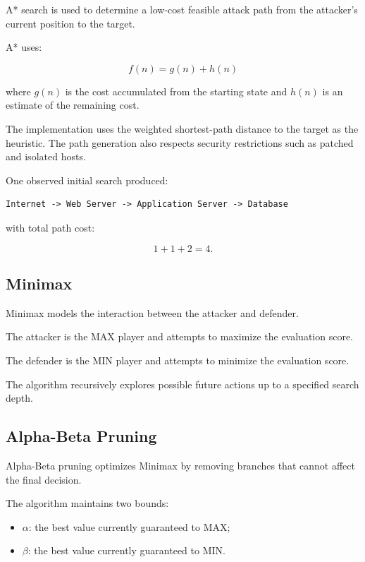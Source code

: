 \documentclass[12pt,a4paper]{article}
\begin{document}
A* search is used to determine a low-cost feasible attack path from the
attacker's current position to the target.

A* uses:

\begin{equation}
f(n) = g(n) + h(n)
\end{equation}

where $g(n)$ is the cost accumulated from the starting state and $h(n)$ is an
estimate of the remaining cost.

The implementation uses the weighted shortest-path distance to the target as
the heuristic. The path generation also respects security restrictions such
as patched and isolated hosts.

One observed initial search produced:

\begin{verbatim}
Internet -> Web Server -> Application Server -> Database
\end{verbatim}

with total path cost:

\[
1 + 1 + 2 = 4.
\]

\subsection{Minimax}

Minimax models the interaction between the attacker and defender.

The attacker is the MAX player and attempts to maximize the evaluation score.

The defender is the MIN player and attempts to minimize the evaluation score.

The algorithm recursively explores possible future actions up to a specified
search depth.

\subsection{Alpha-Beta Pruning}

Alpha-Beta pruning optimizes Minimax by removing branches that cannot affect
the final decision.

The algorithm maintains two bounds:

\begin{itemize}
    \item $\alpha$: the best value currently guaranteed to MAX;
    \item $\beta$: the best value currently guaranteed to MIN.
\end{itemize}
\end{document}
